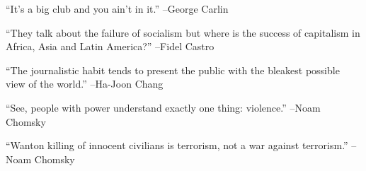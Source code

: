 \documentclass{article}%
\begin{document}
\linebreak%
\vspace{1mm}%
\begin{minipage}{\textwidth}%
\flushleft%
“It's a big club and you ain't in it.”%
\linebreak%
\vspace{1mm}%
–George Carlin%
\linebreak%
\vspace{1mm}%
\end{minipage}%
\linebreak%
\vspace{1mm}%
\begin{minipage}{\textwidth}%
\flushleft%
“They talk about the failure of socialism but where is the success of capitalism in Africa, Asia and Latin America?”%
\linebreak%
\vspace{1mm}%
–Fidel Castro%
\linebreak%
\vspace{1mm}%
\end{minipage}%
\linebreak%
\vspace{1mm}%
\begin{minipage}{\textwidth}%
\flushleft%
“The journalistic habit tends to present the public with the bleakest possible view of the world.”%
\linebreak%
\vspace{1mm}%
–Ha{-}Joon Chang%
\linebreak%
\vspace{1mm}%
\end{minipage}%
\linebreak%
\vspace{1mm}%
\begin{minipage}{\textwidth}%
\flushleft%
“See, people with power understand exactly one thing: violence.”%
\linebreak%
\vspace{1mm}%
–Noam Chomsky%
\linebreak%
\vspace{1mm}%
\end{minipage}%
\linebreak%
\vspace{1mm}%
\begin{minipage}{\textwidth}%
\flushleft%
“Wanton killing of innocent civilians is terrorism, not a war against terrorism.”%
\linebreak%
\vspace{1mm}%
–Noam Chomsky%
\linebreak%
\vspace{1mm}%
\end{minipage}%
\end{document}
